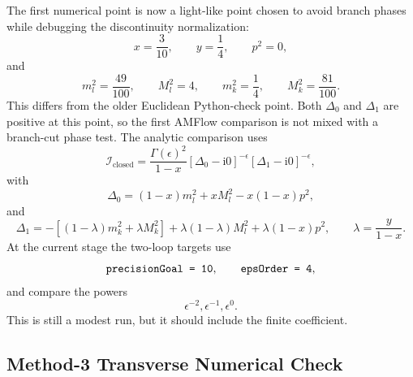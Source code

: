 \documentclass[11pt]{article}
\newcommand{\ii}{\mathrm{i}}
\newcommand{\eps}{\epsilon}
\newcommand{\WL}[1]{\texttt{\detokenize{#1}}}
\begin{document}
The first numerical point is now a light-like point chosen to avoid branch
phases while debugging the discontinuity normalization:
\begin{equation}
  x=\frac{3}{10},\qquad y=\frac14,\qquad p^2=0,
\end{equation}
and
\begin{equation}
  m_l^2=\frac{49}{100},\qquad
  M_l^2=4,\qquad
  m_k^2=\frac14,\qquad
  M_k^2=\frac{81}{100}.
\end{equation}
This differs from the older Euclidean Python-check point. Both \(\Delta_0\)
and \(\Delta_1\) are positive at this point, so the first AMFlow comparison is
not mixed with a branch-cut phase test.
The analytic comparison uses
\begin{equation}
  \mathcal I_{\mathrm{closed}}
  =
  \frac{\Gamma(\eps)^2}{1-x}
  [\Delta_0-\ii0]^{-\eps}
  [\Delta_1-\ii0]^{-\eps},
\end{equation}
with
\begin{equation}
  \Delta_0=(1-x)m_l^2+xM_l^2-x(1-x)p^2,
\end{equation}
and
\begin{equation}
  \Delta_1=
  -\left[(1-\lambda)m_k^2+\lambda M_k^2\right]
  +\lambda(1-\lambda)M_l^2
  +\lambda(1-x)p^2,
  \qquad
  \lambda=\frac{y}{1-x}.
\end{equation}
At the current stage the two-loop targets use
\begin{equation}
  \WL{precisionGoal = 10},\qquad \WL{epsOrder = 4},
\end{equation}
and compare the powers
\begin{equation}
  \eps^{-2},\eps^{-1},\eps^0.
\end{equation}
This is still a modest run, but it should include the finite coefficient.

\subsection{Method-3 Transverse Numerical Check}
\end{document}
